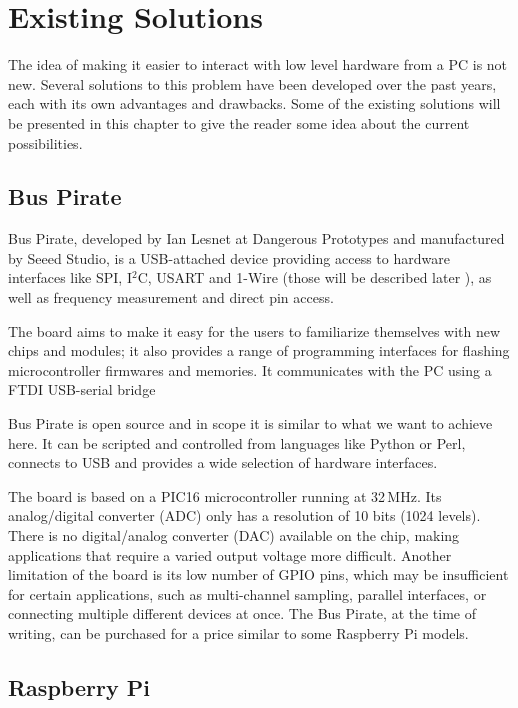 \chapter{Existing Solutions}

The idea of making it easier to interact with low level hardware from a PC is not new. Several solutions to this problem have been developed over the past years, each with its own advantages and drawbacks. Some of the existing solutions will be presented in this chapter to give the reader some idea about the current possibilities.

\section{Bus Pirate}



Bus Pirate, developed by Ian Lesnet at Dangerous Prototypes and manufactured by Seeed Studio, is a USB-attached device providing access to hardware interfaces like SPI, I$^2$C, USART and 1-Wire (those will be described later  ), as well as frequency measurement and direct pin access.

The board aims to make it easy for the users to familiarize themselves with new chips and modules; it also provides a range of programming interfaces for flashing microcontroller firmwares and memories. It communicates with the PC using a FTDI USB-serial bridge

Bus Pirate is open source and in scope it is similar to what we want to achieve here. It can be scripted and controlled from languages like Python or Perl, connects to USB and provides a wide selection of hardware interfaces.

The board is based on a PIC16 microcontroller running at 32\,MHz. Its analog/digital converter (ADC) only has a resolution of 10 bits (1024 levels). There is no digital/analog converter (DAC) available on the chip, making applications that require a varied output voltage more difficult. Another limitation of the board is its low number of GPIO pins, which may be insufficient for certain applications, such as multi-channel sampling, parallel interfaces, or connecting multiple different devices at once. The Bus Pirate, at the time of writing, can be purchased for a price similar to some Raspberry Pi models.

\section{Raspberry Pi}

